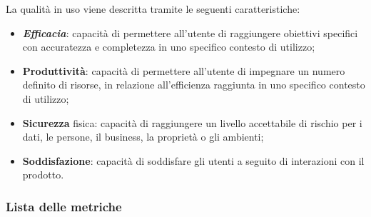 \documentclass[10pt, a4paper]{article}
\begin{document}
La qualità in uso viene descritta tramite le seguenti caratteristiche:
\begin{itemize}
    \item \textbf{\textit{Efficacia\pg}}: capacità di permettere all'utente di raggiungere obiettivi specifici con accuratezza e completezza in uno specifico contesto di utilizzo;
    \item \textbf{Produttività}: capacità di permettere all'utente di impegnare un numero definito di risorse, in relazione all'efficienza raggiunta in uno specifico contesto di utilizzo;
    \item \textbf{Sicurezza} fisica: capacità di raggiungere un livello accettabile di rischio per i dati, le persone, il business, la proprietà o gli ambienti;
    \item \textbf{Soddisfazione}: capacità di soddisfare gli utenti a seguito di interazioni con il prodotto. 
\end{itemize}



\subsubsection{Lista delle metriche}
\end{document}
